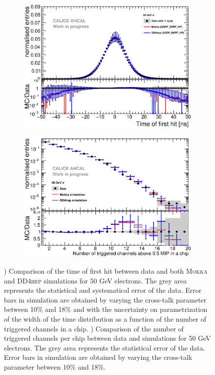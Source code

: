 \documentclass{JINST}
\newcommand\mokka{\textsc{Mokka}\xspace}
\newcommand\ddhep{\textsc{DD4hep}\xspace}
\begin{document}
\begin{figure}[htbp!]
  \centering
  \begin{subfigure}[t]{0.49\textwidth}
    \includegraphics[width=1\textwidth]{fig/Comparison_SimData_Electrons50GeV.eps}
    \caption{}\label{fig:elec_sim_data_50GeV}
  \end{subfigure}
  \hfill
  \begin{subfigure}[t]{0.49\textwidth}
    \includegraphics[width=1\textwidth]{fig/Comparison_SimData_Electrons_nHits_50GeV.eps}
    \caption{}\label{fig:elec_sim_data_nHits_50GeV}
  \end{subfigure}
  \caption{) Comparison of the time of first hit between data and both \mokka and \ddhep simulations for 50 GeV electrons. The grey area represents the statistical and systematical error of the data. Error bars in simulation are obtained by varying the cross-talk parameter between 10\% and 18\% and with the uncertainty on parametrization of the width of the time distribution as a function of the number of triggered channels in a chip. ) Comparison of the number of triggered channels per chip between data and simulations for 50 GeV electrons. The grey area represents the statistical error of the data. Error bars in simulation are obtained by varying the cross-talk parameter between 10\% and 18\%.}
\end{figure}
\end{document}
